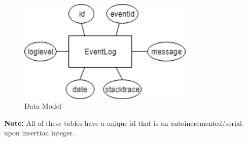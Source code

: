 \begin{figure}[!ht]
	\centering
	\includegraphics[width=0.75\textwidth]{./Chapter3/Figures/Logging_Db.png}
	\caption{Data Model}
	\label{fig:LoggingModel}
\end{figure}


\textbf{Note:} All of these tables have a unique id that is an autoincremented/serial upon insertion integer.


